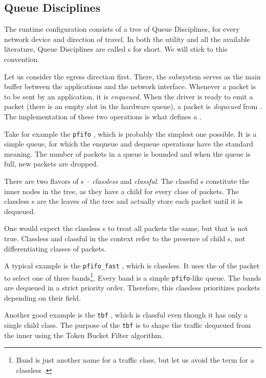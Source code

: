 \subsection{Queue Disciplines}

The  runtime configuration consists of a tree of Queue Disciplines, for
every network device and direction of travel. In both the  utility and
all the available literature, Queue Disciplines are called \qdisc{}s for short. We
will stick to this convention.

Let us consider the egress direction first. There, the  subsystem serves as the main buffer
between the applications and the network interface. Whenever a packet is to be sent
by an application, it is \emph{enqueued}. When the driver is ready to emit
a packet (there is an empty slot in the hardware queue), a packet is
\emph{dequeued} from . The implementation of these two operations is what
defines a \qdisc.

Take for example the \texttt{pfifo} \qdisc{}, which is probably the simplest
one possible. It is a simple  queue, for which the enqueue and dequeue
operations have the standard meaning. The number of packets in a queue is
bounded and when the queue is full, new packets are dropped.

There are two flavors of \qdisc{}s -- \emph{classless} and \emph{classful}.
The classful \qdisc{}s constitute the inner nodes in the \qdisc{} tree, as they
have a child \qdisc{} for every class of packets. The classless \qdisc{}s
are the leaves of the tree and actually store each packet
until it is dequeued.

One would expect the classless \qdisc{}s to treat all packets the same,
but that is not true. Classless and classful in the  context refer
to the presence of child \qdisc{}s, not differentiating classes of packets.

A typical example is the \texttt{pfifo\_fast} \qdisc, which is classless. It
uses the  of the packet to select one of three bands\footnote{Band is
just another name for a traffic class, but let us avoid the term for a classless
\qdisc.}. Every band is a simple \texttt{pfifo}-like queue. The bands are
dequeued in a strict priority order. Therefore, this classless \qdisc{}
prioritizes packets depending on their  field.

Another good example is the \texttt{tbf} \qdisc{}, which is classful even though
it has only a single child class. The purpose of the \texttt{tbf} \qdisc{} is to shape the
traffic dequeued from the inner \qdisc{} using the Token Bucket Filter algorithm.

